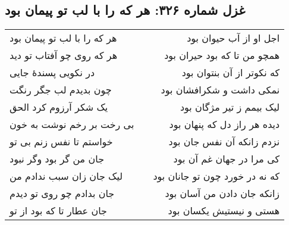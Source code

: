 \begin{center}
\section*{غزل شماره ۳۲۶: هر که را با لب تو پیمان بود}
\label{sec:326}
\begin{longtable}{l p{0.5cm} r}
هر که را با لب تو پیمان بود
&&
اجل او از آب حیوان بود
\\
هر که روی چو آفتاب تو دید
&&
همچو من تا که بود حیران بود
\\
در نکویی پسندهٔ جایی
&&
که نکوتر از آن بنتوان بود
\\
چون بدیدم لب جگر رنگت
&&
نمکی داشت و شکرافشان بود
\\
یک شکر آرزوم کرد الحق
&&
لیک بیمم ز تیر مژگان بود
\\
بی رخت بر رخم نوشت به خون
&&
دیده هر راز دل که پنهان بود
\\
خواستم تا نفس زنم بی تو
&&
نزدم زانکه آن نفس جان بود
\\
جان من گر بود وگر نبود
&&
کی مرا در جهان غم آن بود
\\
لیک جان زان سبب ندادم من
&&
که نه در خورد چون تو جانان بود
\\
جان بدادم چو روی تو دیدم
&&
زانکه جان دادن من آسان بود
\\
جان عطار تا که بود از تو
&&
هستی و نیستیش یکسان بود
\\
\end{longtable}
\end{center}
